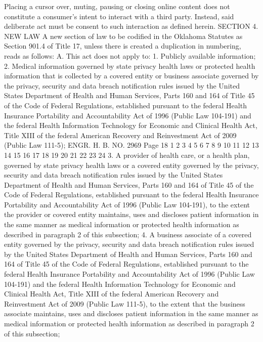 Placing a cursor over, muting, pausing or closing online content
does not constitute a consumer's intent to interact with a third
party. Instead, said deliberate act must be consent to such
interaction as defined herein.
SECTION 4. NEW LAW A new section of law to be codified
in the Oklahoma Statutes as Section 901.4 of Title 17, unless there
is created a duplication in numbering, reads as follows:
A. This act does not apply to:
1. Publicly available information;
2. Medical information governed by state privacy health laws or
protected health information that is collected by a covered entity
or business associate governed by the privacy, security and data
breach notification rules issued by the United States Department of
Health and Human Services, Parts 160 and 164 of Title 45 of the Code
of Federal Regulations, established pursuant to the federal Health
Insurance Portability and Accountability Act of 1996 (Public Law
104-191) and the federal Health Information Technology for Economic
and Clinical Health Act, Title XIII of the federal American Recovery
and Reinvestment Act of 2009 (Public Law 111-5);
ENGR. H. B. NO. 2969 Page 18
1
2
3
4
5
6
7
8
9
10
11
12
13
14
15
16
17
18
19
20
21
22
23
24
3. A provider of health care, or a health plan, governed by
state privacy health laws or a covered entity governed by the
privacy, security and data breach notification rules issued by the
United States Department of Health and Human Services, Parts 160 and
164 of Title 45 of the Code of Federal Regulations, established
pursuant to the federal Health Insurance Portability and
Accountability Act of 1996 (Public Law 104-191), to the extent the
provider or covered entity maintains, uses and discloses patient
information in the same manner as medical information or protected
health information as described in paragraph 2 of this subsection;
4. A business associate of a covered entity governed by the
privacy, security and data breach notification rules issued by the
United States Department of Health and Human Services, Parts 160 and
164 of Title 45 of the Code of Federal Regulations, established
pursuant to the federal Health Insurance Portability and
Accountability Act of 1996 (Public Law 104-191) and the federal
Health Information Technology for Economic and Clinical Health Act,
Title XIII of the federal American Recovery and Reinvestment Act of
2009 (Public Law 111-5), to the extent that the business associate
maintains, uses and discloses patient information in the same manner
as medical information or protected health information as described
in paragraph 2 of this subsection;
